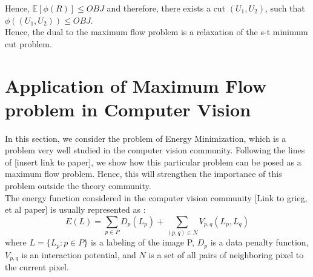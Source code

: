 \documentclass[BTech]{iitmdiss}
\begin{document}
	  Hence, $\mathbb{E}[\phi(R)] \leq OBJ$ and therefore, there exists a cut $(U_1,U_2)$, such that $\phi((U_1, U_2)) \leq OBJ$. \\
	  
	  Hence, the dual to the maximum flow problem is a relaxation of the s-t minimum cut problem.
	  
	  \section{Application of Maximum Flow problem in Computer Vision}
	    In this section, we consider the problem of Energy Minimization, which is a problem very well studied in the computer vision community.
	  Following the lines of [insert link to paper], we show how this particular problem can be posed as a maximum flow problem. Hence, this will
	  strengthen the importance of this problem outside the theory community. \\
	  
	  The energy function considered in the computer vision community [Link to grieg, et al paper] is usually represented as :
	  $$E(L) = \displaystyle\sum_{p \in P} D_{p}(L_{p}) + \displaystyle\sum_{(p,q) \in N} V_{p,q}(L_p, L_q)$$
	  where 
	  $L = \{L_p : p \in P\}$ is a labeling of the image P, $D_p$ is a data penalty function, $V_{p,q}$ is an interaction potential, and 
	  $N$ is a set of all pairs of neighboring pixel to the current pixel. \\
	  
\end{document}

